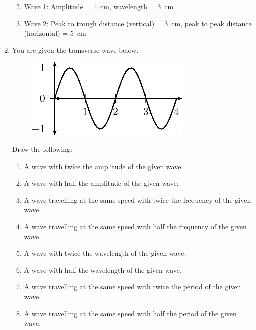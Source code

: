 \begin{enumerate}[noitemsep, label=\textbf{\arabic*}. ]
\begin{enumerate}[noitemsep, label=\textbf{\alph*}. ]
            \label{m38806*uid36}\item Wave 1: Amplitude = 1~cm, wavelength = 3~cm
\label{m38806*uid37}\item Wave 2: Peak to trough distance (vertical) = 3~cm, peak to peak distance (horizontal) = 5~cm
\end{enumerate}
                \label{m38806*uid38}\item You are given the transverse wave below.
    \setcounter{subfigure}{0}
	\begin{figure}[H] %
    \begin{center}
    \label{m38806*id320895!!!underscore!!!media}\label{m38806*id320895!!!underscore!!!printimage}\includegraphics[width=300px]{col11305.imgs/m38806_PG10C5_013.png} %
      \vspace{2pt}
    \vspace{.1in}
    \end{center}
 \end{figure}       
Draw the following:
\label{m38806*id320905}\begin{enumerate}[noitemsep, label=\textbf{\alph*}. ] 
            \label{m38806*uid39}\item A wave with twice the amplitude of the given wave.
\label{m38806*uid40}\item A wave with half the amplitude of the given wave.
\label{m38806*uid41}\item A wave travelling at the same speed with twice the frequency of the given wave.
\label{m38806*uid42}\item A wave travelling at the same speed with half the frequency of the given wave.
\label{m38806*uid43}\item A wave with twice the wavelength of the given wave.
\label{m38806*uid44}\item A wave with half the wavelength of the given wave.
\label{m38806*uid45}\item A wave travelling at the same speed with twice the period of the given wave.
\label{m38806*uid46}\item A wave travelling at the same speed with half the period of the given wave.

\end{enumerate}
\end{enumerate}
